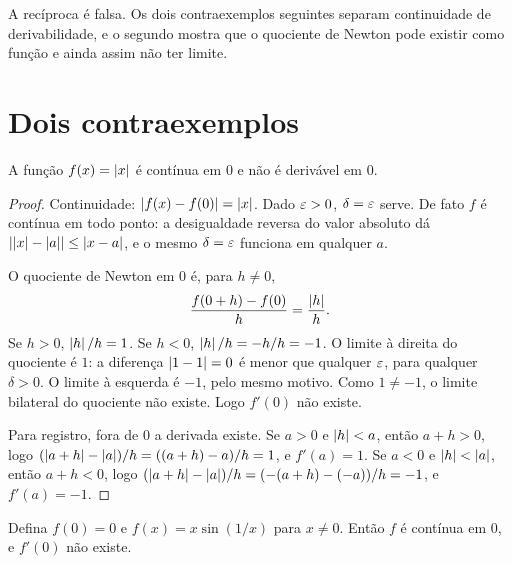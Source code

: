 \documentclass[11pt,a4paper]{article}
\begin{document}
A rec\'iproca \'e falsa. Os dois contraexemplos seguintes separam continuidade de derivabilidade, e o segundo mostra que o quociente de Newton pode existir como fun\c{c}\~ao e ainda assim n\~ao ter limite.

\section{Dois contraexemplos}
\label{sec:contra}

\begin{contraexemplo}
\label{cx:abs}
A fun\c{c}\~ao $f(x)=\left\lvert x \right\rvert$ \'e cont\'inua em $0$ e n\~ao \'e deriv\'avel em $0$.
\end{contraexemplo}

\begin{proof}
Continuidade: $\left\lvert f(x)-f(0) \right\rvert=\left\lvert x \right\rvert$. Dado $\varepsilon>0$, $\delta=\varepsilon$ serve. De fato $f$ \'e cont\'inua em todo ponto: a desigualdade reversa do valor absoluto d\'a $\left\lvert \left\lvert x \right\rvert-\left\lvert a \right\rvert \right\rvert\le \left\lvert x-a \right\rvert$, e o mesmo $\delta=\varepsilon$ funciona em qualquer $a$.

O quociente de Newton em $0$ \'e, para $h\neq 0$,
\[
\frac{f(0+h)-f(0)}{h}=\frac{\left\lvert h \right\rvert}{h}.
\]
Se $h>0$, $\left\lvert h \right\rvert/h=1$. Se $h<0$, $\left\lvert h \right\rvert/h=-h/h=-1$. O limite \`a direita do quociente \'e $1$: a diferen\c{c}a $\left\lvert 1-1 \right\rvert=0$ \'e menor que qualquer $\varepsilon$, para qualquer $\delta>0$. O limite \`a esquerda \'e $-1$, pelo mesmo motivo. Como $1\neq -1$, o limite bilateral do quociente n\~ao existe. Logo $f'(0)$ n\~ao existe.

Para registro, fora de $0$ a derivada existe. Se $a>0$ e $\left\lvert h \right\rvert<a$, ent\~ao $a+h>0$, logo $(\left\lvert a+h \right\rvert-\left\lvert a \right\rvert)/h=((a+h)-a)/h=1$, e $f'(a)=1$. Se $a<0$ e $\left\lvert h \right\rvert<\left\lvert a \right\rvert$, ent\~ao $a+h<0$, logo $(\left\lvert a+h \right\rvert-\left\lvert a \right\rvert)/h=(-(a+h)-(-a))/h=-1$, e $f'(a)=-1$.
\end{proof}

\begin{contraexemplo}
\label{cx:xsen}
Defina $f(0)=0$ e $f(x)=x\sin(1/x)$ para $x\neq 0$. Ent\~ao $f$ \'e cont\'inua em $0$, e $f'(0)$ n\~ao existe.
\end{contraexemplo}
\end{document}
